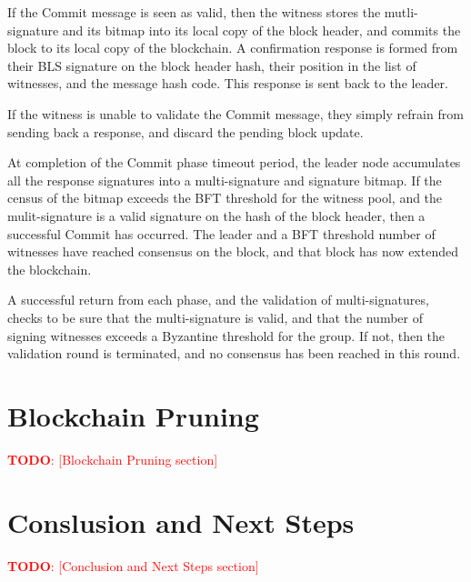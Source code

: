 \documentclass[a4paper, 10pt, conference]{ieeeconf}
\newcommand\todo[1]{\textcolor{red}{\textbf{TODO}: [#1]}}
\begin{document}
\begin{itemize}
{{	\item{If the Commit message is seen as valid, then the witness stores the mutli-signature and its bitmap into its local copy of the block header, and commits the block to its local copy of the blockchain. A confirmation response is formed from their BLS signature on the block header hash, their position in the list of witnesses, and the message hash code. This response is sent back to the leader.}

	\item{If the witness is unable to validate the Commit message, they simply refrain from sending back a response, and discard the pending block update.}}

	\item{At completion of the Commit phase timeout period, the leader node accumulates all the response signatures into a multi-signature and signature bitmap. If the census of the bitmap exceeds the BFT threshold for the witness pool, and the mulit-signature is a valid signature on the hash of the block header, then a successful Commit has occurred. The leader and a BFT threshold number of witnesses have reached consensus on the block, and that block has now extended the blockchain.}
	}
\end{itemize}

A successful return from each phase, and the validation of multi-signatures, checks to be sure that the multi-signature is valid, and that the number of signing witnesses exceeds a Byzantine threshold for the group. If not, then the validation round is terminated, and no consensus has been reached in this round.

\section{Blockchain Pruning}

\todo{Blockchain Pruning section}

\section{Conslusion and Next Steps}

\todo{Conclusion and Next Steps section}
\end{document}
